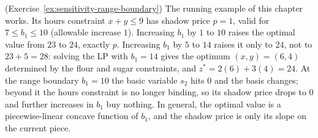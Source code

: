 \begin{solution}(Exercise~\ref{ex:sensitivity-range-boundary})
The running example of this chapter works.  Its hours constraint $x + y \leq 9$ has shadow price $p = 1$, valid for $7 \leq b_1 \leq 10$ (allowable increase $1$).  Increasing $b_1$ by $1$ to $10$ raises the optimal value from $23$ to $24$, exactly $p$.  Increasing $b_1$ by $5$ to $14$ raises it only to $24$, not to $23 + 5 = 28$: solving the LP with $b_1 = 14$ gives the optimum $(x, y) = (6, 4)$ determined by the flour and sugar constraints, and $z^* = 2(6) + 3(4) = 24$.  At the range boundary $b_1 = 10$ the basic variable $s_2$ hits $0$ and the basis changes; beyond it the hours constraint is no longer binding, so its shadow price drops to $0$ and further increases in $b_1$ buy nothing.  In general, the optimal value is a piecewise-linear concave function of $b_1$, and the shadow price is only its slope on the current piece.
\end{solution}
